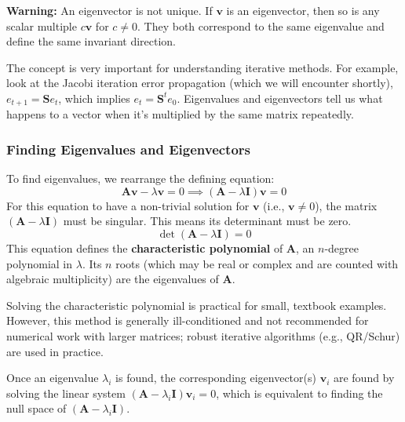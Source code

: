 \begin{warningBox}
    \textbf{Warning:} An eigenvector is not unique. If $\mathbf{v}$ is an eigenvector, then so is any scalar multiple $c\mathbf{v}$ for $c \neq 0$. They both correspond to the same eigenvalue and define the same invariant direction.
\end{warningBox}

The concept is very important for understanding iterative methods. For example, look at the Jacobi iteration error propagation (which we will encounter shortly), $e_{t+1} = \mathbf{S}e_t$, which implies $e_t = \mathbf{S}^t e_0$. Eigenvalues and eigenvectors tell us what happens to a vector when it's multiplied by the same matrix repeatedly.

\subsubsection{Finding Eigenvalues and Eigenvectors}

To find eigenvalues, we rearrange the defining equation:
$$ \mathbf{A}\mathbf{v} - \lambda \mathbf{v} = 0 \implies (\mathbf{A} - \lambda \mathbf{I})\mathbf{v} = 0 $$
For this equation to have a non-trivial solution for $\mathbf{v}$ (i.e., $\mathbf{v} \neq 0$), the matrix $(\mathbf{A} - \lambda \mathbf{I})$ must be singular. This means its determinant must be zero.
$$ \det(\mathbf{A} - \lambda \mathbf{I}) = 0 $$
This equation defines the \textbf{characteristic polynomial} of $\mathbf{A}$, an $n$-degree polynomial in $\lambda$. Its $n$ roots (which may be real or complex and are counted with algebraic multiplicity) are the eigenvalues of $\mathbf{A}$.

Solving the characteristic polynomial is practical for small, textbook examples. However, this method is generally ill-conditioned and not recommended for numerical work with larger matrices; robust iterative algorithms (e.g., QR/Schur) are used in practice.

Once an eigenvalue $\lambda_i$ is found, the corresponding eigenvector(s) $\mathbf{v}_i$ are found by solving the linear system $(\mathbf{A} - \lambda_i \mathbf{I})\mathbf{v}_i = 0$, which is equivalent to finding the null space of $(\mathbf{A} - \lambda_i \mathbf{I})$.

